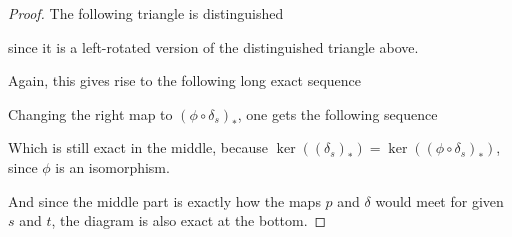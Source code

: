 \begin{proof}
    The following triangle is distinguished
    \begin{center}
    \end{center}
    since it is a left-rotated version of the distinguished triangle above.

    Again, this gives rise to the following long exact sequence
    \begin{center}
    \end{center}
    Changing the right map to \( (\phi \circ \delta_s)_* \), one gets the following sequence
    \begin{center}
    \end{center}
    Which is still exact in the middle, because \( \ker((\delta_s)_*) = \ker((\phi \circ \delta_s)_*) \), since \( \phi \) is an isomorphism.

    And since the middle part is exactly how the maps \( p \) and \( \delta \) would meet for given \( s \) and \( t \), the diagram is also exact at the bottom.


\end{proof}
